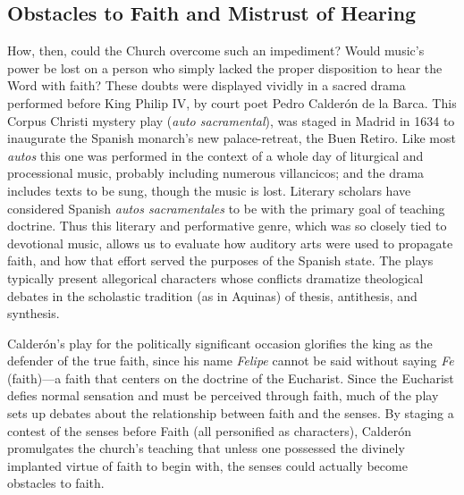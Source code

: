 \subsection{Obstacles to Faith and Mistrust of Hearing}

How, then, could the Church overcome such an impediment?
Would music's power be lost on a person who simply lacked the proper disposition
to hear the Word with faith?
These doubts were displayed vividly in a sacred drama performed before King
Philip IV,  by court poet Pedro Calderón de
la Barca.%
    \Autocite{Calderon:Retiro}
This Corpus Christi mystery play (\emph{auto sacramental}), was staged in Madrid
in 1634 to inaugurate the Spanish monarch's new palace-retreat, the Buen Retiro.
Like most \emph{autos} this one was performed in the context of a whole day of
liturgical and processional music, probably including numerous villancicos; and
the drama includes texts to be sung, though the music is lost.
Literary scholars have considered Spanish \emph{autos sacramentales} to be
 with the primary goal of teaching
doctrine.
Thus this literary and performative genre, which was so closely tied to
devotional music, allows us to evaluate how auditory arts were used to propagate
faith, and how that effort served the purposes of the Spanish state.
The plays typically present allegorical characters whose conflicts dramatize
theological debates in the scholastic tradition (as in Aquinas) of thesis,
antithesis, and synthesis.

Calderón's play for the politically significant occasion glorifies the king as
the defender of the true faith, since his name \emph{Felipe} cannot be said
without saying \emph{Fe} (faith)---a faith that centers on the doctrine of the
Eucharist.%
    \Autocite[\poemline{\XXX}]{Calderon:Retiro}
Since the Eucharist defies normal sensation and must be perceived through faith,
much of the play sets up debates about the relationship between faith and the
senses.
By staging a contest of the senses before Faith (all personified as characters),
Calderón promulgates the church's teaching that unless one possessed the
divinely implanted virtue of faith to begin with, the senses could actually
become obstacles to faith.

